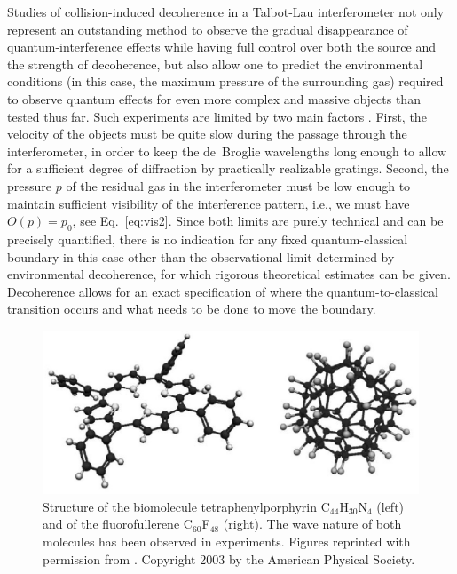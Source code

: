 \documentclass[12pt,aps,floatfix,amsmath,amssymb,showpacs,nofootinbib]{revtex4-2}
\begin{document}
Studies of collision-induced decoherence in a Talbot-Lau
interferometer not only represent an outstanding method to observe the
gradual disappearance of quantum-interference effects while having
full control over both the source and the strength of decoherence, but
also allow one to predict the environmental conditions (in this case,
the maximum pressure of the surrounding gas) required to observe
quantum effects for even more complex and massive objects than tested
thus far. Such experiments are limited by two main factors
\cite{Hornberger:2003:tv,Hackermuller:2003:uu}. First, the velocity of
the objects must be quite slow during the passage through the
interferometer, in order to keep the de~Broglie wavelengths long
enough to allow for a sufficient degree of diffraction by practically
realizable gratings. Second, the pressure $p$ of the residual gas in
the interferometer must be low enough to maintain sufficient
visibility of the interference pattern, i.e., we must have $O(p) =
p_0$, see Eq.~\eqref{eq:vis2}.  Since both limits are purely technical
and can be precisely quantified, there is no indication for any fixed
quantum-classical boundary in this case other than the observational
limit determined by environmental decoherence, for which rigorous
theoretical estimates can be given. Decoherence allows for an exact
specification of where the quantum-to-classical transition occurs and
what needs to be done to move the boundary.

\begin{figure}
\begin{center}
  \includegraphics[scale=.43]{biomol-n.eps}
\end{center}
\caption[Structure of the biomolecule
tetraphenylporphyrin C$_{44}$H$_{30}$N$_4$ and of the fluorofullerene
C$_{60}$F$_{48}$]{\label{fig:biomol} Structure of the biomolecule
  tetraphenylporphyrin C$_{44}$H$_{30}$N$_4$ (left) and of the
  fluorofullerene C$_{60}$F$_{48}$ (right). The wave nature of both
  molecules has been observed in experiments.  Figures reprinted with
  permission from \cite{Hackermueller:2002:wb}.  Copyright 2003
  by the American Physical Society.}
\end{figure}
\end{document}
